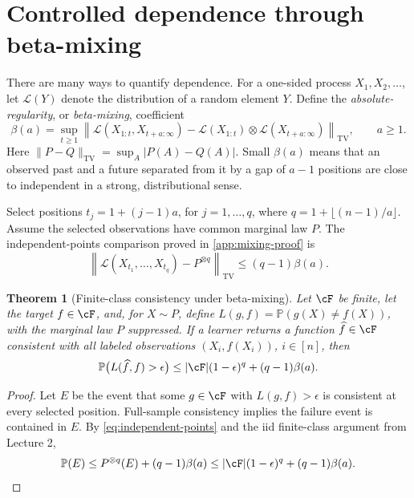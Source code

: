\documentclass[11pt,twoside]{article}
\renewcommand{\P}{\mathbb P}
\newcommand{\TV}{\mathrm{TV}}
\newtheorem{theorem}{Theorem}[section]
\theoremstyle{definition}
\theoremstyle{remark}
\begin{document}
\section{Controlled dependence through beta-mixing}
\label{sec:mixing}

There are many ways to quantify dependence. For a one-sided process
\(X_1,X_2,\ldots\), let \(\mathcal L(Y)\) denote the distribution of a
random element \(Y\). Define the \emph{absolute-regularity}, or
\emph{beta-mixing}, coefficient
\begin{equation}
 \beta(a)=\sup_{t\geq1}
 \left\|
 \mathcal L(X_{1:t},X_{t+a:\infty})
 -\mathcal L(X_{1:t})\otimes\mathcal L(X_{t+a:\infty})
 \right\|_{\TV},
 \qquad a\geq1.
 \label{eq:beta}
\end{equation}
Here \(\|P-Q\|_{\TV}=\sup_A|P(A)-Q(A)|\). Small \(\beta(a)\) means that an
observed past and a future separated from it by a gap of \(a-1\) positions are
close to independent in a strong, distributional sense.

Select positions \(t_j=1+(j-1)a\), for \(j=1,\ldots,q\), where
\(q=1+\lfloor(n-1)/a\rfloor\). Assume the selected observations have common
marginal law \(P\). The independent-points comparison proved in
\cref{app:mixing-proof} is
\begin{equation}
 \left\|\mathcal L(X_{t_1},\ldots,X_{t_q})-P^{\otimes q}\right\|_{\TV}
 \leq(q-1)\beta(a).
 \label{eq:independent-points}
\end{equation}

\begin{theorem}[Finite-class consistency under beta-mixing]
\label{thm:mixing-finite-class}
Let \(\cF\) be finite, let the target \(f\in\cF\), and, for \(X\sim P\),
define \(L(g,f)=\P(g(X)\neq f(X))\), with the marginal law \(P\)
suppressed. If a learner returns a function
\(\widehat f\in\cF\) consistent with all labeled observations
\((X_i,f(X_i))\), \(i\in[n]\), then
\begin{equation}
 \P\bigl(L(\widehat f,f)>\epsilon\bigr)
 \leq |\cF|(1-\epsilon)^q+(q-1)\beta(a).
 \label{eq:mixing-bound}
\end{equation}
\end{theorem}

\begin{proof}
Let \(E\) be the event that some \(g\in\cF\) with
\(L(g,f)>\epsilon\) is consistent at every selected position. Full-sample
consistency implies the failure event is contained in \(E\). By
\cref{eq:independent-points} and the iid finite-class argument from Lecture 2,
\[
 \P(E)\leq P^{\otimes q}(E)+(q-1)\beta(a)
 \leq |\cF|(1-\epsilon)^q+(q-1)\beta(a).
\]
\end{proof}
\end{document}
